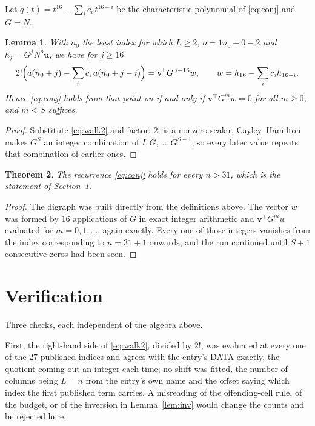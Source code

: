 \documentclass[11pt,a4paper]{article}
\theoremstyle{plain}
\newtheorem{theorem}{Theorem}
\newtheorem{lemma}[theorem]{Lemma}
\theoremstyle{definition}
\begin{document}
Let $q(t)=t^{16}-\sum_i c_i\,t^{16-i}$ be the characteristic polynomial of
\eqref{eq:conj} and $G=N$.

\begin{lemma}\label{lem:crit}
With $n_0$ the least index for which $L\ge2$, $o=1n_0+0-2$ and
$h_j=G^{j}N^{o}\mathbf{u}$, we have for $j\ge16$
\[
2!\Bigl(a(n_0+j)-\sum_i c_i\,a(n_0+j-i)\Bigr)=\mathbf{v}^{\!\top}G^{\,j-16}w,
\qquad w=h_{16}-\sum_i c_i h_{16-i} .
\]
Hence \eqref{eq:conj} holds from that point on if and only if
$\mathbf{v}^{\!\top}G^{m}w=0$ for all $m\ge0$, and $m<S$ suffices.
\end{lemma}

\begin{proof}
Substitute \eqref{eq:walk2} and factor; $2!$ is a nonzero scalar. Cayley--Hamilton
makes $G^{S}$ an integer combination of $I,G,\dots,G^{S-1}$, so every later value repeats
that combination of earlier ones.
\end{proof}

\begin{theorem}
The recurrence \eqref{eq:conj} holds for every $n>31$, which is the statement of
Section~1.
\end{theorem}

\begin{proof}
The digraph was built directly from the definitions above. The vector $w$ was formed by
$16$ applications of $G$ in exact integer arithmetic and $\mathbf{v}^{\!\top}G^{m}w$
evaluated for $m=0,1,\dots$, again exactly. Every one of those integers vanishes from the
index corresponding to $n=31+1$ onwards, and the run continued until $S+1$ consecutive
zeros had been seen.
\end{proof}

\section{Verification}

Three checks, each independent of the algebra above.

First, the right-hand side of \eqref{eq:walk2}, divided by $2!$, was evaluated at every
one of the $27$ published indices and agrees with the entry's DATA exactly, the quotient
coming out an integer each time; no shift was fitted, the number of columns being
$L=n$ from the entry's own name and the offset saying which index the first published
term carries. A misreading of the offending-cell rule, of the budget, or of the inversion in
Lemma~\ref{lem:inv} would change the counts and be rejected here.
\end{document}
